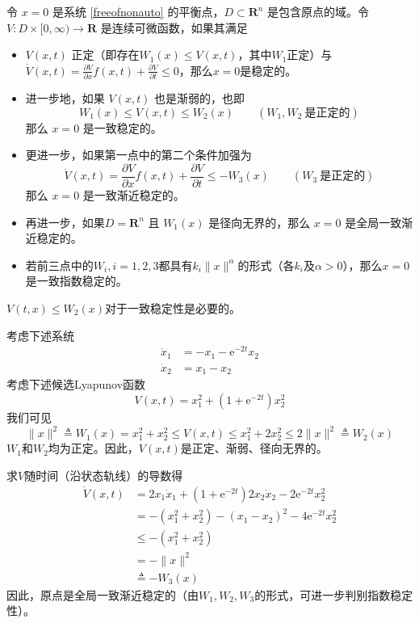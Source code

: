 \begin{theorem}[时变系统的Lyapunov稳定性定理]
  令 $x = 0$ 是系统 \eqref{freeofnonauto} 的平衡点，$D \subset
  \mathbf{R}^n$ 是包含原点的域。令 $V: D \times [0, \infty) \rightarrow \mathbf{R}$
  是连续可微函数，如果其满足
  \begin{itemize}[leftmargin=1em]
    \item $V (x, t)$ 正定（即存在$W_1 (x) \leq V (x, t)$，其中$W_1$正定）与
    $\dot{V} (x, t) = \frac{\partial V}{\partial x} f (x, t) + \frac{\partial V}{\partial t} \leq 0$，那么$x=0$是稳定的。
    
    \item 进一步地，如果 $V (x, t)$ 也是渐弱的，也即
    \[ W_1 (x) \leq V (x, t) \leq W_2 (x) \qquad (W_1, W_2 \ \text{是正定的}) \]
    那么 $x = 0$ 是一致稳定的。
    
    \item 更进一步，如果第一点中的第二个条件加强为
    \[ \dot{V} (x, t) = \frac{\partial V}{\partial x} f (x, t) + \frac{\partial
       V}{\partial t} \leq - W_3 (x) \qquad (W_3 \ \text{是正定的}) \]
    那么 $x = 0$ 是一致渐近稳定的。
    
    \item 再进一步，如果$D=\mathbf{R}^n$ 且 $W_1 (x)$ 是径向无界的，那么 $x = 0$ 是全局一致渐近稳定的。

    \item 若前三点中的$W_i,i=1,2,3$都具有$k_i \| x \|^\alpha $的形式（各$k_i$及$\alpha> 0$），那么$x = 0$ 是一致指数稳定的。
  \end{itemize}
\end{theorem}
\begin{note}
  $V(t,x)\le W_2(x)$对于一致稳定性是必要的。
\end{note}
\begin{example}
  考虑下述系统
  \begin{align*}
    \dot{x}_1 & = - x_1 - \mathrm{e}^{- 2 t} x_2\\
    \dot{x}_2 & = x_1 - x_2
  \end{align*}
  考虑下述候选Lyapunov函数
  \[ V (x, t) = x^2_1 + (1 + \mathrm{e}^{- 2 t}) x^2_2 \]
  我们可见
  \[ \| x \|^2 \triangleq W_1 (x) = x^2_1 + x^2_2 \leq V (x, t) \leq x^2_1 + 2
     x^2_2  \leq 2 \| x \|^2 \triangleq W_2 (x) \]
  $W_1$和$W_2$均为正定。因此，$V (x, t)$是正定、渐弱、径向无界的。
  
  求$V$随时间（沿状态轨线）的导数得
  \begin{align*}
    \dot{V} (x, t) & =  2 x_1 \dot{ x}_1 + (1 + \mathrm{e}^{- 2 t}) 2 x_2 \dot{x}_2 -
    2 \mathrm{e}^{- 2 t} x^2_2\\
    & =  - (x^2_1 + x^2_2) - (x_1 - x_2)^2 - 4 \mathrm{e}^{- 2 t} x^2_2\\
    & \leq  - (x^2_1 + x^2_2)\\
    &  = - \| x \|^2\\
    &\triangleq  - W_3 (x)
  \end{align*}
  因此，原点是全局一致渐近稳定的（由$W_1,W_2,W_3$的形式，可进一步判别指数稳定性）。
\end{example}